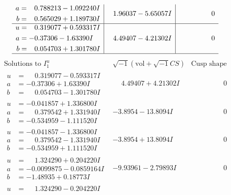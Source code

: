 \documentclass[1p]{elsarticle_modified}
\theoremstyle{definition}
\newcommand{\I}{\sqrt{-1}}
\begin{document}
$$\begin{array}{c|c|c}
\begin{aligned}
a &= \phantom{-}0.788213 - 1.092240 I \\
b &= \phantom{-}0.565029 + 1.189730 I\end{aligned}
 & \phantom{-}1.96037 - 5.65057 I & \phantom{-0.000000 } 0 \\ \hline\begin{aligned}
u &= \phantom{-}0.319077 + 0.593317 I \\
a &= -0.37306 - 1.63390 I \\
b &= \phantom{-}0.054703 + 1.301780 I\end{aligned}
 & \phantom{-}4.49407 - 4.21302 I & \phantom{-0.000000 } 0\\
 \hline 
 \end{array}$$\newpage$$\begin{array}{c|c|c}  
\text{Solutions to }I^u_{1}& \I (\text{vol} + \sqrt{-1}CS) & \text{Cusp shape}\\
 \hline 
\begin{aligned}
u &= \phantom{-}0.319077 - 0.593317 I \\
a &= -0.37306 + 1.63390 I \\
b &= \phantom{-}0.054703 - 1.301780 I\end{aligned}
 & \phantom{-}4.49407 + 4.21302 I & \phantom{-0.000000 } 0 \\ \hline\begin{aligned}
u &= -0.041857 + 1.336800 I \\
a &= \phantom{-}0.379542 + 1.331940 I \\
b &= -0.534959 - 1.111520 I\end{aligned}
 & -3.8954 - 13.8094 I & \phantom{-0.000000 } 0 \\ \hline\begin{aligned}
u &= -0.041857 - 1.336800 I \\
a &= \phantom{-}0.379542 - 1.331940 I \\
b &= -0.534959 + 1.111520 I\end{aligned}
 & -3.8954 + 13.8094 I & \phantom{-0.000000 } 0 \\ \hline\begin{aligned}
u &= \phantom{-}1.324290 + 0.204220 I \\
a &= -0.0099875 - 0.0859164 I \\
b &= -1.48935 + 0.18773 I\end{aligned}
 & -9.93961 - 2.79893 I & \phantom{-0.000000 } 0 \\ \hline\begin{aligned}
u &= \phantom{-}1.324290 - 0.204220 I \\

\end{aligned}
\end{array}$$
\end{document}
